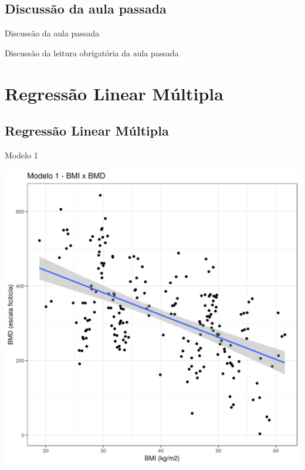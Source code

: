 \documentclass{beamer}
\begin{document}
\subsection{Discussão da aula passada}

\begin{frame}{Discussão da aula passada}
  \begin{block}{}
    Discussão da leitura obrigatória da aula passada
  \end{block}
\end{frame}

\section{Regressão Linear Múltipla}

\subsection{Regressão Linear Múltipla}

\begin{frame}{\small Modelo 1}
  \begin{center}
    \includegraphics[height=.9\textheight]{Cap31-32/pratica-rlm1}
  \end{center}
\end{frame}
\end{document}
